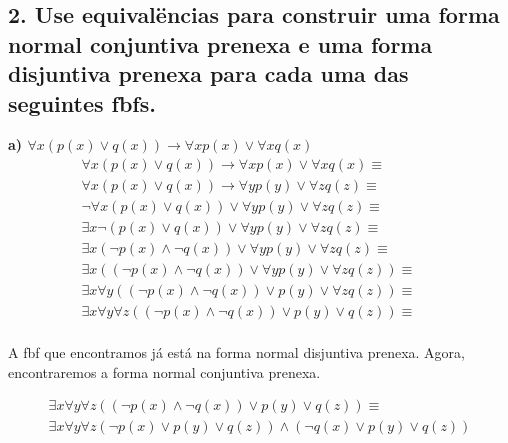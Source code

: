 \subsection*{2. Use equivalëncias para construir uma forma normal conjuntiva prenexa e uma forma disjuntiva prenexa para cada uma das seguintes fbfs.}

\textbf{a) $\forall x (p(x) \lor q(x)) \rightarrow \forall x p(x) \lor \forall x q(x) $} \\
\begin{align*}
\forall x (p(x) \lor q(x)) \rightarrow \forall x p(x) \lor \forall x q(x) \equiv \\
\forall x (p(x) \lor q(x)) \rightarrow \forall y p(y) \lor \forall z q(z) \equiv && \tag*{Renom.} \\
\lnot \forall x (p(x) \lor q(x)) \lor \forall y p(y) \lor \forall z q(z) \equiv && \tag*{Rem. $\rightarrow$} \\
\exists x \lnot (p(x) \lor q(x)) \lor \forall y p(y) \lor \forall z q(z) \equiv && \tag*{$\lnot \forall$} \\
\exists x (\lnot p(x) \land \lnot q(x)) \lor \forall y p(y) \lor \forall z q(z) \equiv && \tag*{$\lnot (A \lor B) \equiv \lnot A \land \lnot B $} \\
\exists x ((\lnot p(x) \land \lnot q(x)) \lor \forall y p(y) \lor \forall z q(z)) \equiv \\
\exists x \forall y ((\lnot p(x) \land \lnot q(x)) \lor p(y) \lor \forall z q(z)) \equiv \\
\exists x \forall y \forall z ((\lnot p(x) \land \lnot q(x)) \lor p(y) \lor q(z)) \equiv \\
\end{align*}

A fbf que encontramos já está na forma normal disjuntiva prenexa.
Agora, encontraremos a forma normal conjuntiva prenexa.

\begin{align*}
\exists x \forall y \forall z ((\lnot p(x) \land \lnot q(x)) \lor p(y) \lor q(z)) \equiv \\
\exists x \forall y \forall z (\lnot p(x) \lor p(y) \lor q(z)) \land (\lnot q(x) \lor p(y) \lor q(z))
\end{align*}
